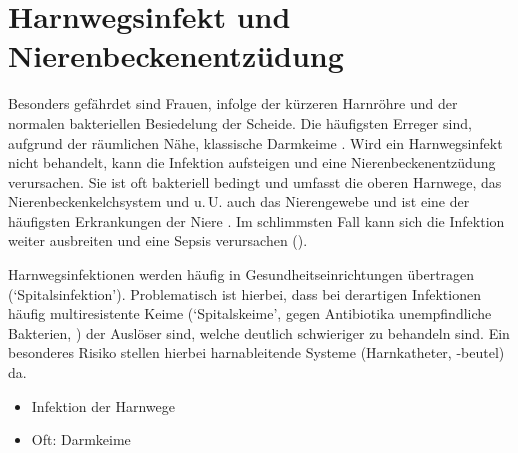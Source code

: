 


\section{Harnwegsinfekt und Nierenbeckenentzüdung }
\label{topic:harnwegsinfekt}%
\label{topic:nierenbeckenentzuendung}%


{%
 Besonders gefährdet sind
Frauen, infolge der kürzeren Harnröhre und der
normalen bakteriellen Besiedelung der Scheide. Die
häufigsten Erreger sind, aufgrund der räumlichen
Nähe, klassische Darmkeime .
Wird ein Harnwegsinfekt nicht behandelt, kann die
Infektion aufsteigen und eine Nierenbeckenentzüdung
verursachen.  
Sie ist oft bakteriell bedingt 
und umfasst die oberen Harnwege, das Nierenbeckenkelchsystem
und u.\,U. auch das Nierengewebe und ist eine der häufigsten
Erkrankungen der Niere \cite{Pschy259}. 
Im schlimmsten Fall kann sich
die Infektion weiter ausbreiten und eine Sepsis
verursachen ().

Harnwegsinfektionen werden häufig in
Gesundheitseinrichtungen übertragen
(\enquote*{Spitalsinfektion}).
Problematisch ist hierbei, dass bei derartigen Infektionen
häufig multiresistente Keime (\enquote*{Spitalskeime},
gegen Antibiotika unempfindliche Bakterien,
) der Auslöser
sind, welche deutlich schwieriger zu behandeln sind. Ein
besonderes Risiko stellen hierbei harnableitende Systeme
(Harnkatheter, -beutel) da.
}
{%
\begin{itemize}
  \item Infektion der Harnwege
  \item Oft: Darmkeime
\end{itemize}
}
{}
{}
{}



